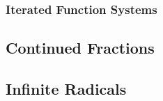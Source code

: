 

\subsubsection{Iterated Function Systems}




\subsection{Continued Fractions}



\subsection{Infinite Radicals}






